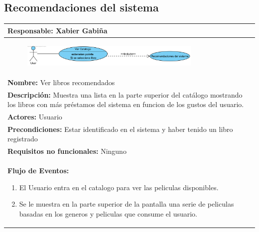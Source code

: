 \documentclass{report}
\begin{document}
                \clearpage
            \subsection{Recomendaciones del sistema}
                \begin{center}
                    \begin{longtable}{|p{\linewidth}|}
                        \hline
                        \textbf{Responsable:} Xabier Gabiña\\
                        \hline
                        \begin{figure}[H]
                            \centering
                            \includegraphics[width=0.8\textwidth]{./img/casos_uso/RecomendacionesLibros.png}
                        \end{figure}\\
                        \hline
                        \textbf{Nombre:} Ver libros recomendados\\
                        \hline
                        \textbf{Descripción:} Muestra una lista en la parte superior del catálogo mostrando los libros con más préstamos del sistema en funcion de los gustos del usuario.\\
                        \hline
                        \textbf{Actores:} Usuario\\
                        \hline
                        \textbf{Precondiciones:} Estar identificado en el sistema y haber tenido un libro registrado\\
                        \hline
                        \textbf{Requisitos no funcionales:} Ninguno\\
                        \hline
                        \textbf{Flujo de Eventos:}
                        \begin{enumerate}
                            \item El Usuario entra en el catalogo para ver las peliculas disponibles.
                            \item Se le muestra en la parte superior de la pantalla una serie de peliculas basadas en los generos y peliculas que consume el usuario.
                        \end{enumerate}\\
                        \hline

\end{longtable}
\end{center}
\end{document}
